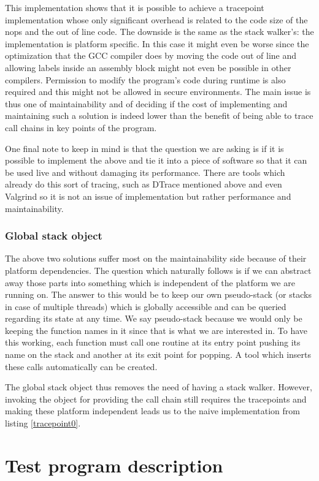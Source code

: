 This implementation shows that it is possible to achieve a tracepoint implementation whose only significant overhead is related to the code size of the nops and the out of line code. The downside is the same as the stack walker's: the implementation is platform specific. In this case it might even be worse since the optimization that the GCC compiler does by moving the code out of line and allowing labels inside an assembly block might not even be possible in other compilers. Permission to modify the program's code during runtime is also required and this might not be allowed in secure environments. The main issue is thus one of maintainability and of deciding if the cost of implementing and maintaining such a solution is indeed lower than the benefit of being able to trace call chains in key points of the program.

One final note to keep in mind is that the question we are asking is if it is possible to implement the above and tie it into a piece of software so that it can be used live and without damaging its performance. There are tools which already do this sort of tracing, such as DTrace mentioned above and even Valgrind so it is not an issue of implementation but rather performance and maintainability.

\subsubsection{Global stack object}
\label{subsubsection:globalstackobject}

The above two solutions suffer most on the maintainability side because of their platform dependencies. The question which naturally follows is if we can abstract away those parts into something which is independent of the platform we are running on. The answer to this would be to keep our own pseudo-stack (or stacks in case of multiple threads) which is globally accessible and can be queried regarding its state at any time. We say pseudo-stack because we would only be keeping the function names in it since that is what we are interested in. To have this working, each function must call one routine at its entry point pushing its name on the stack and another at its exit point for popping. A tool which inserts these calls automatically can be created.

The global stack object thus removes the need of having a stack walker. However, invoking the object for providing the call chain still requires the tracepoints and making these platform independent leads us to the naive implementation from listing \ref{tracepoint0}.

\section{Test program description}
\label{section:testprogram}
